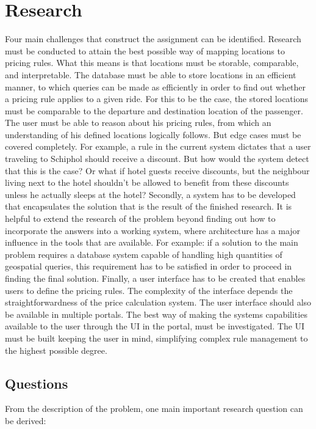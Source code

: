 \section{Research}
Four main challenges that construct the assignment can be identified. Research must be conducted to attain the best possible way of mapping locations to pricing rules. What this means is that locations must be storable, comparable, and interpretable. The database must be able to store locations in an efficient manner, to which queries can be made as efficiently in order to find out whether a pricing rule applies to a given ride. For this to be the case, the stored locations must be comparable to the departure and destination location of the passenger. The user must be able to reason about his pricing rules, from which an understanding of his defined locations logically follows. But edge cases must be covered completely. For example, a rule in the current system dictates that a user traveling to Schiphol should receive a discount. But how would the system detect that this is the case? Or what if hotel guests receive discounts, but the neighbour living next to the hotel shouldn't be allowed to benefit from these discounts unless he actually sleeps at the hotel? Secondly, a system has to be developed that encapsulates the solution that is the result of the finished research. It is helpful to extend the research of the problem beyond finding out how to incorporate the answers into a working system, where architecture has a major influence in the tools that are available. For example: if a solution to the main problem requires a database system capable of handling high quantities of geospatial queries, this requirement has to be satisfied in order to proceed in finding the final solution. Finally, a user interface has to be created that enables users to define the pricing rules. The complexity of the interface depends the straightforwardness of the price calculation system. The user interface should also be available in multiple portals. The best way of making the systems capabilities available to the user through the UI in the portal, must be investigated. The UI must be built keeping the user in mind, simplifying complex rule management to the highest possible degree.

\subsection{Questions}

From the description of the problem, one main important research question can be derived:

